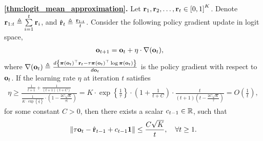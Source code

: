 {\bf \cref{thm:logit_mean_approximation}.} Let ${\mathbf{r}}_1, {\mathbf{r}}_2, \dots, {\mathbf{r}}_t \in \left[ 0, 1  \right]^K$. Denote ${\mathbf{r}}_{1:t} \triangleq \sum\limits_{i=1}^{t}{{\mathbf{r}}_i}$, and $\hat{{\mathbf{r}}}_t \triangleq \frac{{\mathbf{r}}_{1:t}}{t}$. Consider the following policy gradient update in logit space,
\begin{equation*}
\begin{split}
    {\mathbf{o}}_{t+1} &= {\mathbf{o}}_t + \eta \cdot \nabla({\mathbf{o}}_t),
\end{split}
\end{equation*}
where $\nabla({\mathbf{o}}_t) \triangleq \frac{d \left\{ {\boldsymbol{\pi}}({\mathbf{o}}_t)^\top {\mathbf{r}}_t - \tau {\boldsymbol{\pi}}({\mathbf{o}}_t)^\top \log{{\boldsymbol{\pi}}({\mathbf{o}}_t)} \right\} }{d {\mathbf{o}}_t} $ is the policy gradient with respect to ${\mathbf{o}}_t$. If the learning rate $\eta$ at iteration $t$ satisfies
\begin{equation*}
\begin{split}
    \eta \ge \frac{ \frac{1}{t+1} + \frac{1}{(t+1)(t+C)} }{ \frac{1}{K \cdot \exp\left\{ \frac{1}{\tau} \right\} } \cdot \left( 1 - \frac{2 C \sqrt{K}}{\tau t} \right)  } = K \cdot \exp\left\{ \frac{1}{\tau} \right\} \cdot \left( 1 + \frac{1}{t+C} \right) \cdot \frac{t}{\left( t+1\right) \left( t - \frac{2C\sqrt{K}}{\tau} \right)} = O\left( \frac{1}{t} \right),
\end{split}
\end{equation*}
for some constant $C > 0$, then there exists a scalar $c_{t-1} \in {\mathbb{R}}$, such that
\begin{equation*}
    \left\| \tau {\mathbf{o}}_{t} - \hat{{\mathbf{r}}}_{t-1} + c_{t-1} {\mathbf{1}} \right\| \le \frac{C \sqrt{K}}{t}, \quad \forall t \ge 1.
\end{equation*}
